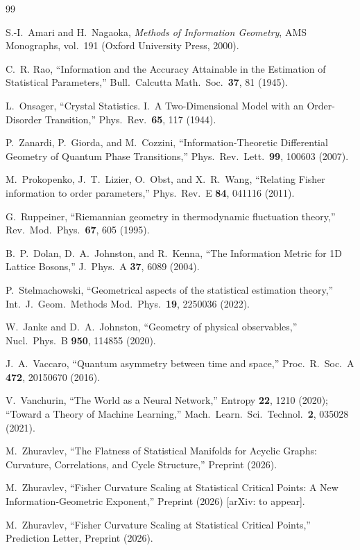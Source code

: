 \documentclass[twocolumn,showpacs,preprintnumbers,amsmath,amssymb,prl]{revtex4-2}
\begin{document}
\begin{thebibliography}{99}

  S.-I.\ Amari and H.\ Nagaoka,
  \textit{Methods of Information Geometry},
  AMS Monographs, vol.~191 (Oxford University Press, 2000).

  C.~R. Rao,
  ``Information and the Accuracy Attainable in the Estimation of Statistical
  Parameters,''
  Bull.\ Calcutta Math.\ Soc.\ \textbf{37}, 81 (1945).

  L.\ Onsager,
  ``Crystal Statistics. I.\ A Two-Dimensional Model with an Order-Disorder
  Transition,''
  Phys.\ Rev.\ \textbf{65}, 117 (1944).

  P.\ Zanardi, P.\ Giorda, and M.\ Cozzini,
  ``Information-Theoretic Differential Geometry of Quantum Phase Transitions,''
  Phys.\ Rev.\ Lett.\ \textbf{99}, 100603 (2007).

  M.\ Prokopenko, J.\ T.\ Lizier, O.\ Obst, and X.\ R.\ Wang,
  ``Relating Fisher information to order parameters,''
  Phys.\ Rev.\ E \textbf{84}, 041116 (2011).

  G.\ Ruppeiner,
  ``Riemannian geometry in thermodynamic fluctuation theory,''
  Rev.\ Mod.\ Phys.\ \textbf{67}, 605 (1995).

  B.\ P.\ Dolan, D.\ A.\ Johnston, and R.\ Kenna,
  ``The Information Metric for 1D Lattice Bosons,''
  J.\ Phys.\ A \textbf{37}, 6089 (2004).

  P.\ Stelmachowski,
  ``Geometrical aspects of the statistical estimation theory,''
  Int.\ J.\ Geom.\ Methods Mod.\ Phys.\ \textbf{19}, 2250036 (2022).

  W.\ Janke and D.\ A.\ Johnston,
  ``Geometry of physical observables,''
  Nucl.\ Phys.\ B \textbf{950}, 114855 (2020).

  J.\ A.\ Vaccaro,
  ``Quantum asymmetry between time and space,''
  Proc.\ R.\ Soc.\ A \textbf{472}, 20150670 (2016).

  V.\ Vanchurin,
  ``The World as a Neural Network,''
  Entropy \textbf{22}, 1210 (2020);
  ``Toward a Theory of Machine Learning,''
  Mach.\ Learn.\ Sci.\ Technol.\ \textbf{2}, 035028 (2021).

  M.\ Zhuravlev,
  ``The Flatness of Statistical Manifolds for Acyclic Graphs: Curvature,
  Correlations, and Cycle Structure,''
  Preprint (2026).

  M.\ Zhuravlev,
  ``Fisher Curvature Scaling at Statistical Critical Points: A New
  Information-Geometric Exponent,''
  Preprint (2026) [arXiv: to appear].

  M.\ Zhuravlev,
  ``Fisher Curvature Scaling at Statistical Critical Points,''
  Prediction Letter, Preprint (2026).

\end{thebibliography}
\end{document}
